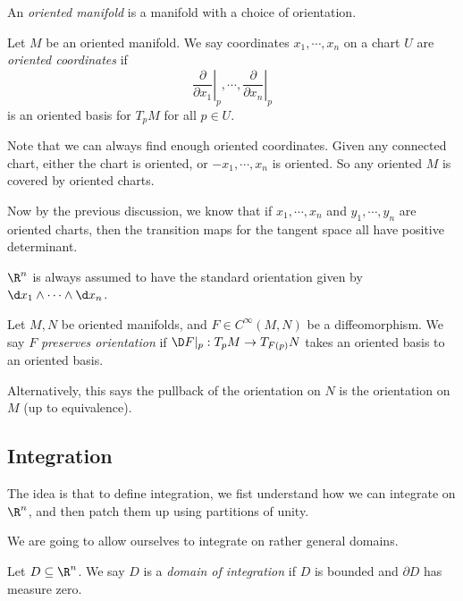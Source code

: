 \documentclass[a4paper]{article}
\begin{document}
\begin{defi}
  An \emph{oriented manifold} is a manifold with a choice of orientation.
\end{defi}

\begin{defi}
  Let $M$ be an oriented manifold. We say coordinates $x_1, \cdots, x_n$ on a chart $U$ are \emph{oriented coordinates} if
  \[
    \left.\frac{\partial}{\partial x_1}\right|_p, \cdots, \left.\frac{\partial}{\partial x_n}\right|_p
  \]
  is an oriented basis for $T_p M$ for all $p \in U$.
\end{defi}
Note that we can always find enough oriented coordinates. Given any connected chart, either the chart is oriented, or $-x_1, \cdots, x_n$ is oriented. So any oriented $M$ is covered by oriented charts.

Now by the previous discussion, we know that if $x_1, \cdots, x_n$ and $y_1, \cdots, y_n$ are oriented charts, then the transition maps for the tangent space all have positive determinant.

\begin{eg}
  $\R^n$ is always assumed to have the standard orientation given by $\d x_1 \wedge \cdots \wedge \d x_n$.
\end{eg}

\begin{defi}
  Let $M, N$ be oriented manifolds, and $F \in C^\infty(M, N)$ be a diffeomorphism. We say $F$ \emph{preserves orientation} if $\D F|_p: T_p M \to T_{F(p)}N$ takes an oriented basis to an oriented basis.

  Alternatively, this says the pullback of the orientation on $N$ is the orientation on $M$ (up to equivalence).
\end{defi}

\subsection{Integration}
The idea is that to define integration, we fist understand how we can integrate on $\R^n$, and then patch them up using partitions of unity.

We are going to allow ourselves to integrate on rather general domains.
\begin{defi}
  Let $D \subseteq \R^n$. We say $D$ is a \emph{domain of integration} if $D$ is bounded and $\partial D$ has measure zero.
\end{defi}
\end{document}
